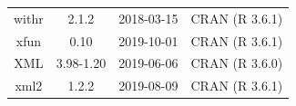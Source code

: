 \documentclass[11pt,]{book}
\begin{document}
\begin{longtable}[]{@{}cccc@{}}
\begin{minipage}[t]{0.18\columnwidth}
withr\strut
\end{minipage} & \begin{minipage}[t]{0.19\columnwidth}\centering\strut
2.1.2\strut
\end{minipage} & \begin{minipage}[t]{0.16\columnwidth}\centering\strut
2018-03-15\strut
\end{minipage} & \begin{minipage}[t]{0.36\columnwidth}\centering\strut
CRAN (R 3.6.1)\strut
\end{minipage}\tabularnewline
\begin{minipage}[t]{0.18\columnwidth}\centering\strut
xfun\strut
\end{minipage} & \begin{minipage}[t]{0.19\columnwidth}\centering\strut
0.10\strut
\end{minipage} & \begin{minipage}[t]{0.16\columnwidth}\centering\strut
2019-10-01\strut
\end{minipage} & \begin{minipage}[t]{0.36\columnwidth}\centering\strut
CRAN (R 3.6.1)\strut
\end{minipage}\tabularnewline
\begin{minipage}[t]{0.18\columnwidth}\centering\strut
XML\strut
\end{minipage} & \begin{minipage}[t]{0.19\columnwidth}\centering\strut
3.98-1.20\strut
\end{minipage} & \begin{minipage}[t]{0.16\columnwidth}\centering\strut
2019-06-06\strut
\end{minipage} & \begin{minipage}[t]{0.36\columnwidth}\centering\strut
CRAN (R 3.6.0)\strut
\end{minipage}\tabularnewline
\begin{minipage}[t]{0.18\columnwidth}\centering\strut
xml2\strut
\end{minipage} & \begin{minipage}[t]{0.19\columnwidth}\centering\strut
1.2.2\strut
\end{minipage} & \begin{minipage}[t]{0.16\columnwidth}\centering\strut
2019-08-09\strut
\end{minipage} & \begin{minipage}[t]{0.36\columnwidth}\centering\strut
CRAN (R 3.6.1)\strut
\end{minipage}\tabularnewline

\end{longtable}
\end{document}
